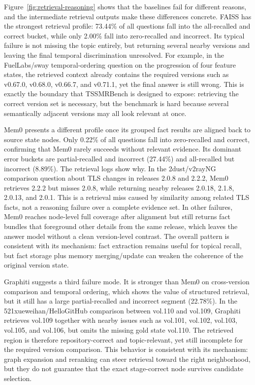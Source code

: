 Figure~\ref{fig:retrieval-reasoning} shows that the baselines fail for different reasons, and the intermediate retrieval outputs make these differences concrete. FAISS has the strongest retrieval profile: 73.44\% of all questions fall into the all-recalled and correct bucket, while only 2.00\% fall into zero-recalled and incorrect. Its typical failure is not missing the topic entirely, but returning several nearby versions and leaving the final temporal discrimination unresolved. For example, in the FuelLabs/sway temporal-ordering question on the progression of four feature states, the retrieved context already contains the required versions such as v0.67.0, v0.68.0, v0.66.7, and v0.71.1, yet the final answer is still wrong. This is exactly the boundary that TSSMRBench is designed to expose: retrieving the correct version set is necessary, but the benchmark is hard because several semantically adjacent versions may all look relevant at once.

Mem0 presents a different profile once its grouped fact results are aligned back to source state nodes. Only 0.22\% of all questions fall into zero-recalled and correct, confirming that Mem0 rarely succeeds without relevant evidence. Its dominant error buckets are partial-recalled and incorrect (27.44\%) and all-recalled but incorrect (8.89\%). The retrieval logs show why. In the 2dust/v2rayNG comparison question about TLS changes in releases 2.0.8 and 2.2.2, Mem0 retrieves 2.2.2 but misses 2.0.8, while returning nearby releases 2.0.18, 2.1.8, 2.0.13, and 2.0.1. This is a retrieval miss caused by similarity among related TLS facts, not a reasoning failure over a complete evidence set. In other failures, Mem0 reaches node-level full coverage after alignment but still returns fact bundles that foreground other details from the same release, which leaves the answer model without a clean version-level contrast. The overall pattern is consistent with its mechanism: fact extraction remains useful for topical recall, but fact storage plus memory merging/update can weaken the coherence of the original version state.

Graphiti suggests a third failure mode. It is stronger than Mem0 on cross-version comparison and temporal ordering, which shows the value of structured retrieval, but it still has a large partial-recalled and incorrect segment (22.78\%). In the 521xueweihan/HelloGitHub comparison between vol.110 and vol.109, Graphiti retrieves vol.109 together with nearby issues such as vol.101, vol.102, vol.103, vol.105, and vol.106, but omits the missing gold state vol.110. The retrieved region is therefore repository-correct and topic-relevant, yet still incomplete for the required version comparison. This behavior is consistent with its mechanism: graph expansion and reranking can steer retrieval toward the right neighborhood, but they do not guarantee that the exact stage-correct node survives candidate selection.

